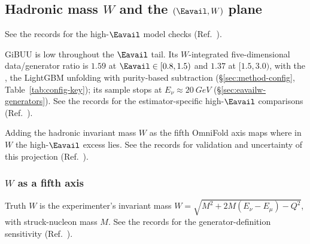 \subsection{Hadronic mass $W$ and the $(\Eavail,W)$ plane}
\label{sec:eavailw}

See the records for the high-$\Eavail$ model checks (Ref.~\cite{NoteRecords2026}).

GiBUU is low throughout the $\Eavail$ tail. Its $W$-integrated five-dimensional data/generator ratio is $1.59$ at $\Eavail\in[0.8,1.5)$ and $1.37$ at $[1.5,3.0)$, with the \estPurity{}, the LightGBM unfolding with purity-based subtraction (\S\ref{sec:method-config}, Table~\ref{tab:config-key}); its sample stops at $E_\nu\approx\SI{20}{GeV}$ (\S\ref{sec:eavailw-generators}). See the records for the estimator-specific high-$\Eavail$ comparisons (Ref.~\cite{NoteRecords2026}).

Adding the hadronic invariant mass $W$ as the fifth OmniFold axis maps where in $W$ the high-$\Eavail$ excess lies. See the records for validation and uncertainty of this projection (Ref.~\cite{NoteRecords2026}).

\subsubsection{$W$ as a fifth axis}
\label{sec:eavailw-axis}

Truth $W$ is the experimenter's invariant mass $W=\sqrt{M^{2}+2M(E_\nu-E_\mu)-Q^{2}}$, with struck-nucleon mass $M$. See the records for the generator-definition sensitivity (Ref.~\cite{NoteRecords2026}).


